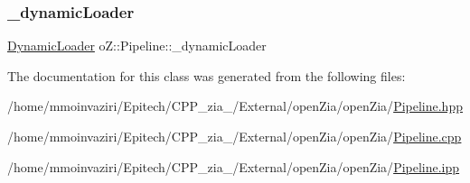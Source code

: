 \subsubsection{\texorpdfstring{\_dynamicLoader}{\_dynamicLoader}}
{\footnotesize\ttfamily \mbox{\hyperlink{classo_z_1_1_dynamic_loader}{Dynamic\+Loader}} o\+Z\+::\+Pipeline\+::\+\_\+dynamic\+Loader\hspace{0.3cm}{\ttfamily [protected]}}



The documentation for this class was generated from the following files\+:\begin{DoxyCompactItemize}
\item 
/home/mmoinvaziri/\+Epitech/\+C\+P\+P\+\_\+zia\+\_/\+External/open\+Zia/open\+Zia/\mbox{\hyperlink{_pipeline_8hpp}{Pipeline.\+hpp}}\item 
/home/mmoinvaziri/\+Epitech/\+C\+P\+P\+\_\+zia\+\_/\+External/open\+Zia/open\+Zia/\mbox{\hyperlink{_pipeline_8cpp}{Pipeline.\+cpp}}\item 
/home/mmoinvaziri/\+Epitech/\+C\+P\+P\+\_\+zia\+\_/\+External/open\+Zia/open\+Zia/\mbox{\hyperlink{_pipeline_8ipp}{Pipeline.\+ipp}}\end{DoxyCompactItemize}
